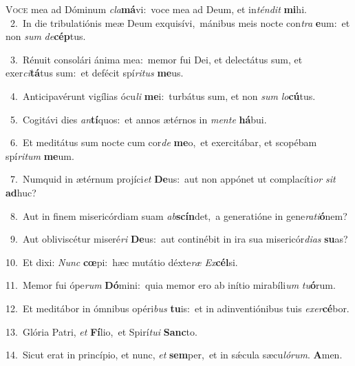 \lettrine{\initial\textcolor{\initialcolor}{V}}{oce} mea ad Dóminum \textit{cla}\-\textbf{má}vi:~\star voce mea ad Deum, et in\-\textit{tén}\-\textit{dit} \textbf{mi}\-hi.\\
{\numbfont\textcolor{\numbcolor}{~2.}}~In die tribulatiónis meæ Deum exquisívi,~\dagger mánibus meis nocte con\textit{tra} \textbf{e}\-um:~\star et non \textit{sum} \textit{de}\-\textbf{cép}tus.\par
{\numbfont\textcolor{\numbcolor}{~3.}}~Rénuit consolári ánima mea:~\dagger memor fui Dei, et delectátus sum, et exer\-\textit{ci}\-\textbf{tá}tus sum:~\star et defécit spí\-\textit{ri}\-\textit{tus} \textbf{me}\-us.\par
{\numbfont\textcolor{\numbcolor}{~4.}}~Anticipavérunt vigílias ócu\textit{li} \textbf{me}\-i:~\star turbátus sum, et non \textit{sum} \textit{lo}\-\textbf{cú}tus.\par
{\numbfont\textcolor{\numbcolor}{~5.}}~Cogitávi dies \textit{an}\-\textbf{tí}quos:~\star et annos ætérnos in \textit{men}\-\textit{te} \textbf{há}\-bui.\par
{\numbfont\textcolor{\numbcolor}{~6.}}~Et meditátus sum nocte cum cor\textit{de} \textbf{me}\-o,~\star et exercitábar, et scopébam spí\-\textit{ri}\-\textit{tum} \textbf{me}\-um.\par
{\numbfont\textcolor{\numbcolor}{~7.}}~Numquid in ætérnum projíci\textit{et} \textbf{De}\-us:~\star aut non appónet ut complacíti\textit{or} \textit{sit} \textbf{ad}\-huc?\par
{\numbfont\textcolor{\numbcolor}{~8.}}~Aut in finem misericórdiam suam \textit{ab}\-\textbf{scín}det,~\star a generatióne in gene\-\textit{ra}\-\textit{ti}\textbf{ó}nem?\par
{\numbfont\textcolor{\numbcolor}{~9.}}~Aut obliviscétur miseré\textit{ri} \textbf{De}\-us:~\star aut continébit in ira sua misericór\-\textit{di}\-\textit{as} \textbf{su}\-as?\par
{\numbfont\textcolor{\numbcolor}{10.}}~Et dixi: \textit{Nunc} \textbf{cœ}\-pi:~\star hæc mutátio déxte\textit{ræ} \textit{Ex}\-\textbf{cél}si.\par
{\numbfont\textcolor{\numbcolor}{11.}}~Memor fui ópe\textit{rum} \textbf{Dó}\-mini:~\star quia memor ero ab inítio mirabíli\textit{um} \textit{tu}\-\textbf{ó}rum.\par
{\numbfont\textcolor{\numbcolor}{12.}}~Et meditábor in ómnibus opéri\textit{bus} \textbf{tu}\-is:~\star et in adinventiónibus tuis \textit{ex}\-\textit{er}\textbf{cé}bor.\par
{\numbfont\textcolor{\numbcolor}{13.}}~Glória Patri, \textit{et} \textbf{Fí}\-lio,~\star et Spirí\-\textit{tu}\-\textit{i} \textbf{Sanc}\-to.\par
{\numbfont\textcolor{\numbcolor}{14.}}~Sicut erat in princípio, et nunc, \textit{et} \textbf{sem}\-per,~\star et in sǽcula sæcu\-\textit{ló}\-\textit{rum}. \textbf{A}\-men.\par
